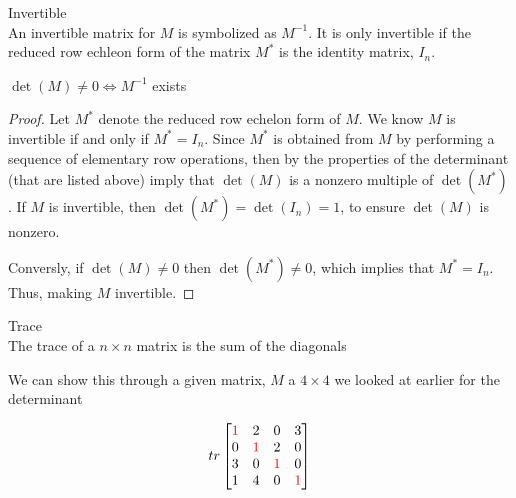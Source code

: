 \begin{definition}{Invertible}\\
    An invertible matrix for $M$ is symbolized as $M^{-1}$. It is only invertible if the reduced row echleon form of the matrix $M^*$ is the identity matrix, $I_n$. 
\end{definition}
\begin{proposition}
     $\det(M) \neq 0 \Longleftrightarrow M^{-1}$ exists
\end{proposition}
\begin{proof}
    Let $M^*$ denote the reduced row echelon form of $M$. We know $M$ is invertible if and only if $M^* = I_n$. Since $M^*$ is obtained from $M$ by performing a sequence of elementary row operations, then by the properties of the determinant (that are listed above) imply that $\det(M)$ is a nonzero multiple of $\det(M^*)$. If $M$ is invertible, then $\det(M^*) = \det(I_n) = 1$, to ensure $\det(M)$ is nonzero. 
    \par Conversly, if $\det(M) \neq 0$ then $\det(M^*) \neq 0$, which implies that $M^* = I_n$.  Thus, making $M$ invertible.
\end{proof}

\begin{definition}{Trace}\\
    The trace of a $n \times n$ matrix is the sum of the diagonals 
\end{definition}
\begin{exmp}
    We can show this through a given matrix, $M$ a $4 \times 4$ we looked at earlier for the determinant
\end{exmp}

\[
tr\begin{bmatrix}
     \color{red}{1}   &   2   &   0   &   3 \\
        0   &   \color{red}{1}    &   2   &   0 \\
        3   &   0  &    \color{red}{1}    &   0 \\
        1   &   4   &   0  &    \color{red}{1}  \\
\end{bmatrix}
\]

